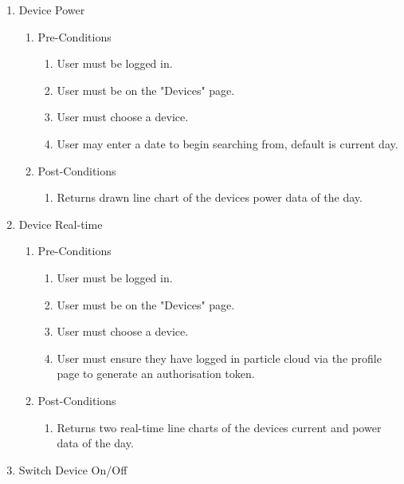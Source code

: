 \documentclass{article}
\begin{document}
\begin{enumerate}
		\item	Device Power
		
		\begin{enumerate}
			\item  Pre-Conditions
			\begin{enumerate}
				\item	User must be logged in.
				\item	User must be on the "Devices" page.
				\item	User must choose a device.
				\item	User may enter a date to begin searching from, default is current day.
			\end{enumerate}
			\item  Post-Conditions		
			\begin{enumerate}
				\item	Returns drawn line chart of the devices power data of the day.
			\end{enumerate}
		\end{enumerate}
		
		\item	Device Real-time
	
		\begin{enumerate}
			\item  Pre-Conditions
			\begin{enumerate}
				\item	User must be logged in.
				\item	User must be on the "Devices" page.
				\item	User must choose a device.
				\item   User must ensure they have logged in particle cloud via the profile page 
				to generate an authorisation token.
			\end{enumerate}
			\item  Post-Conditions		
			\begin{enumerate}
				\item	Returns two real-time line charts of the devices current and power data of the day.
			\end{enumerate}
		\end{enumerate}
		
		\newpage
		\item	Switch Device On/Off
		

\end{enumerate}
\end{document}
